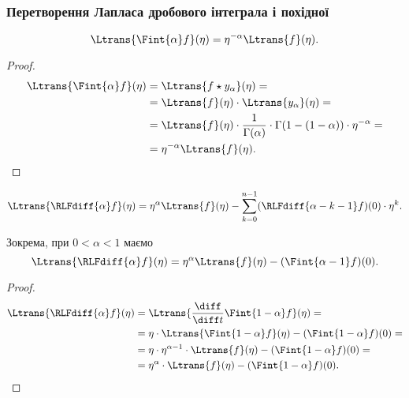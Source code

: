 \subsubsection{Перетворення Лапласа дробового інтеграла і похідної}

\begin{lemma}
    \begin{equation}
        \Ltrans{\Fint{\alpha} f}(\eta) = \eta^{-\alpha} \Ltrans{f}(\eta).
    \end{equation}
\end{lemma}
\begin{proof}
    \begin{equation}
        \begin{aligned}
            \Ltrans{\Fint{\alpha} f}(\eta) &= \Ltrans{f \star y_\alpha}(\eta) = \\
            &= \Ltrans{f}(\eta) \cdot \Ltrans{y_\alpha}(\eta) = \\
            &= \Ltrans{f}(\eta) \cdot \frac{1}{\Gamma(\alpha)} \cdot \Gamma(1 - (1 - \alpha)) \cdot \eta^{-\alpha} = \\
            &= \eta^{-\alpha} \Ltrans{f}(\eta).
        \end{aligned}
    \end{equation}
\end{proof}

\begin{lemma}
    \begin{equation}
        \Ltrans{\RLFdiff{\alpha} f}(\eta) = \eta^{\alpha} \Ltrans{f}(\eta) - \sum_{k = 0}^{n - 1} (\RLFdiff{\alpha - k - 1} f) (0) \cdot \eta^k.
    \end{equation}
\end{lemma}
\begin{example}
    Зокрема, при $0 < \alpha < 1$ маємо
    \begin{equation}
        \Ltrans{\RLFdiff{\alpha} f}(\eta) = \eta^{\alpha} \Ltrans{f}(\eta) - (\Fint{\alpha - 1} f) (0).
    \end{equation}
\end{example}
\begin{proof}
    \begin{equation}
        \begin{aligned}
            \Ltrans{\RLFdiff{\alpha} f}(\eta) &= \Ltrans{\frac{\diff}{\diff t} \Fint{1 - \alpha} f}(\eta) = \\
            &= \eta \cdot \Ltrans{\Fint{1 - \alpha} f}(\eta) - (\Fint{1 - \alpha} f)(0) = \\
            &= \eta \cdot \eta^{\alpha - 1} \cdot \Ltrans{f}(\eta) - (\Fint{1 - \alpha} f)(0) = \\
            &= \eta^\alpha \cdot \Ltrans{f}(\eta) - (\Fint{1 - \alpha} f)(0).
        \end{aligned}
    \end{equation}
\end{proof}

